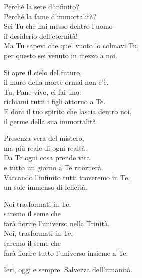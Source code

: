 
\strofa Perché la sete d'infinito?\\
Perché la fame d'immortalità?\\
Sei Tu che hai messo dentro l'uomo\\
il desiderio dell'eternità!\\
Ma Tu sapevi che quel vuoto lo colmavi Tu,\\
per questo sei venuto in mezzo a noi.

\spazio


\spazio

\strofa Si apre il cielo del futuro,\\
il muro della morte ormai non c'è.\\
Tu, Pane vivo, ci fai uno:\\
richiami tutti i figli attorno a Te.\\
E doni il tuo spirito che lascia dentro noi,\\
il germe della sua immortalità.

\spazio


\spazio

\strofa Presenza vera del mistero,\\
ma più reale di ogni realtà.\\
Da Te ogni cosa prende vita\\
e tutto un giorno a Te ritornerà.\\
Varcando l'infinito tutti troveremo in Te,\\
un sole immenso di felicità.

\spazio

\strofa Noi trasformati in Te,\\
saremo il seme che\\
farà fiorire l'universo nella Trinità.\\
Noi, trasformati in Te,\\
saremo il seme che\\
farà fiorire tutto l'universo insieme a Te.

\spazio

 

\spazio

Ieri, oggi e sempre. Salvezza dell'umanità.